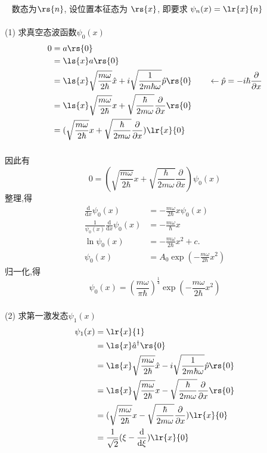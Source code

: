 \begin{frame}
    \frametitle{}
    \解~ 数态为$\rs{n}$, 设位置本征态为 $\rs{x}$, 即要求 $\psi_n (x)=\lr{x}{n} $  \\
    ~~\\ 
    (1) 求真空态波函数$\psi_0 (x)$
    \[ 
  \begin{aligned}
    0 &= a \rs{0}  \\ 
    &= \ls{x} a \rs{0}  \\ 
    &= \ls{x} \sqrt{\frac{m\omega}{2\hbar}}\hat{x} + i \sqrt{\frac{1}{2 m \hbar \omega}} \hat{p} \rs{0}  \qquad \leftarrow \hat{p} = -i \hbar\frac{\partial }{\partial x } \\ 
    &= \ls{x} \sqrt{\frac{m\omega}{2\hbar}} x + \sqrt{\frac{\hbar}{2 m \omega}} \frac{\partial }{\partial x } \rs{0}  \\ 
    &= (\sqrt{\frac{m\omega}{2\hbar}} x + \sqrt{\frac{\hbar}{2 m \omega}} \frac{\partial }{\partial x } )\lr{x}{0} 
  \end{aligned} \] 
\end{frame}

\begin{frame}
    \frametitle{}
    因此有
    $$
        0= (\sqrt{\frac{m\omega}{2\hbar}} x + \sqrt{\frac{\hbar}{2 m \omega}} \frac{\partial }{\partial x } ) \psi_0 (x)   
    $$ 
    整理,得
    \[ \begin{aligned}
        \frac{\mathrm{d}}{\mathrm{d}x} \psi_0 (x)  &= - \frac{m \omega }{2 \hbar} x  \psi_0 (x) \\ 
        \frac{1}{\psi_0 (x)}\frac{\mathrm{d}}{\mathrm{d}x} \psi_0 (x)  &= - \frac{m \omega }{\hbar} x \\
        \ln \psi_0 (x) &= - \frac{m \omega }{2 \hbar} x^2 +c. \\
        \psi_0 (x) &= A_0\exp( - \frac{m \omega }{2 \hbar} x^2)
    \end{aligned}\]
    归一化,得 \[ 
      \psi_0 (x)=  (\frac{m \omega }{\pi  \hbar})^{\frac{1}{4}}  \exp(- \frac{m \omega }{2 \hbar} x^2) \]
    \end{frame}

    \begin{frame}
        \frametitle{}
    (2) 求第一激发态$\psi_1 (x)$
    \[ 
      \begin{aligned}
        \psi_1 (x) &= \lr{x}{1}  \\ 
        &=  \ls{x} \hat{a}^\dagger \rs{0}   \\ 
        &= \ls{x} \sqrt{\frac{m\omega}{2\hbar}}\hat{x} - i \sqrt{\frac{1}{2 m \hbar \omega}} \hat{p} \rs{0}  \\ 
        &= \ls{x} \sqrt{\frac{m\omega}{2\hbar}} x - \sqrt{\frac{\hbar}{2 m \omega}} \frac{\partial }{\partial x } \rs{0}  \\ 
        &= (\sqrt{\frac{m\omega}{2\hbar}} x - \sqrt{\frac{\hbar}{2 m \omega}} \frac{\partial }{\partial x } )\lr{x}{0}  \\ 
        &= \frac{1}{\sqrt{2}} (\xi - \frac{\mathrm{d}}{\mathrm{d}\xi}) \lr{x}{0} 
      \end{aligned} \] 
\end{frame}

